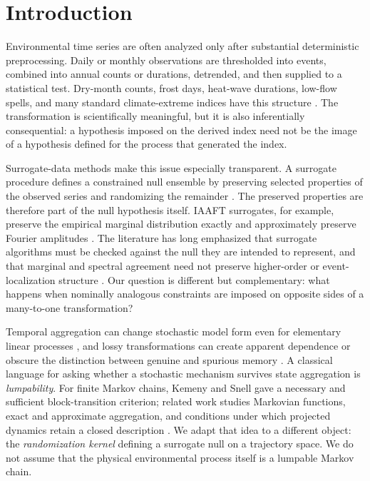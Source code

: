 \section{Introduction}\label{sec:intro}

Environmental time series are often analyzed only after substantial deterministic preprocessing. Daily or monthly observations are thresholded into events, combined into annual counts or durations, detrended, and then supplied to a statistical test. Dry-month counts, frost days, heat-wave durations, low-flow spells, and many standard climate-extreme indices have this structure \cite{Sillmann2013,YangXu2017,BrunnerVoigt2024}. The transformation is scientifically meaningful, but it is also inferentially consequential: a hypothesis imposed on the derived index need not be the image of a hypothesis defined for the process that generated the index.

Surrogate-data methods make this issue especially transparent. A surrogate procedure defines a constrained null ensemble by preserving selected properties of the observed series and randomizing the remainder \cite{Theiler1992,SchreiberSchmitz1996,Schreiber1998,SchreiberSchmitz2000}. The preserved properties are therefore part of the null hypothesis itself. IAAFT surrogates, for example, preserve the empirical marginal distribution exactly and approximately preserve Fourier amplitudes \cite{SchreiberSchmitz1996}. The literature has long emphasized that surrogate algorithms must be checked against the null they are intended to represent, and that marginal and spectral agreement need not preserve higher-order or event-localization structure \cite{Kugiumtzis1999,Venema2006,Keylock2012}. Our question is different but complementary: what happens when nominally analogous constraints are imposed on opposite sides of a many-to-one transformation?

Temporal aggregation can change stochastic model form even for elementary linear processes \cite{StramWei1986}, and lossy transformations can create apparent dependence or obscure the distinction between genuine and spurious memory \cite{Maraun2004,Ohanissian2008}. A classical language for asking whether a stochastic mechanism survives state aggregation is \emph{lumpability}. For finite Markov chains, Kemeny and Snell gave a necessary and sufficient block-transition criterion; related work studies Markovian functions, exact and approximate aggregation, and conditions under which projected dynamics retain a closed description \cite{BurkeRosenblatt1958,KemenySnell1976,RogersPitman1981,Buchholz1994,Geiger2026}. We adapt that idea to a different object: the \emph{randomization kernel} defining a surrogate null on a trajectory space. We do not assume that the physical environmental process itself is a lumpable Markov chain.

